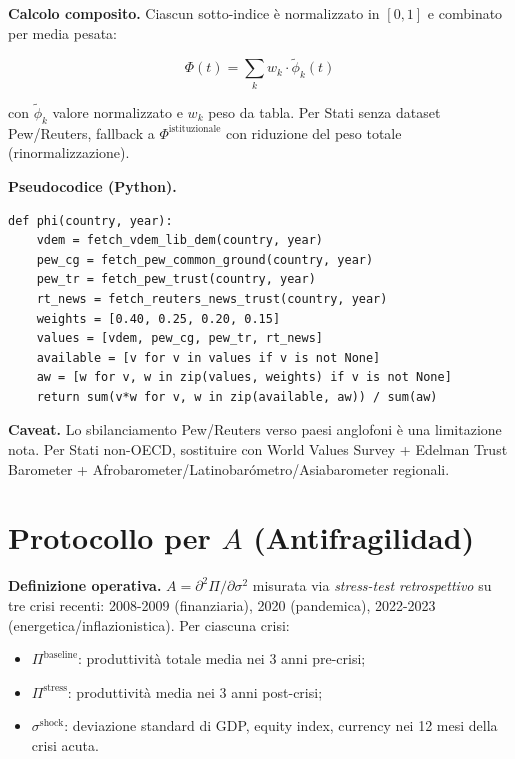 \Proved{} \textbf{Calcolo composito.} Ciascun sotto-indice è
normalizzato in \([0, 1]\) e combinato per media pesata:

\[
\Phi(t) = \sum_k w_k \cdot \tilde{\phi}_k(t)
\]

con \(\tilde{\phi}_k\) valore normalizzato e \(w_k\) peso da tabla.
Per Stati senza dataset Pew/Reuters, fallback a
\(\Phi^{\text{istituzionale}}\) con riduzione del peso totale
(rinormalizzazione).

\Hypoth{} \textbf{Pseudocodice (Python).}

\begin{verbatim}
def phi(country, year):
    vdem = fetch_vdem_lib_dem(country, year)
    pew_cg = fetch_pew_common_ground(country, year)
    pew_tr = fetch_pew_trust(country, year)
    rt_news = fetch_reuters_news_trust(country, year)
    weights = [0.40, 0.25, 0.20, 0.15]
    values = [vdem, pew_cg, pew_tr, rt_news]
    available = [v for v in values if v is not None]
    aw = [w for v, w in zip(values, weights) if v is not None]
    return sum(v*w for v, w in zip(available, aw)) / sum(aw)
\end{verbatim}

\Conj{} \textbf{Caveat.} Lo sbilanciamento Pew/Reuters verso paesi
anglofoni è una limitazione nota. Per Stati non-OECD, sostituire con
World Values Survey + Edelman Trust Barometer +
Afrobarometer/Latinobarómetro/Asiabarometer regionali.



\section{\texorpdfstring{Protocollo per \(A\)
(Antifragilidad)}{Protocollo per A (Antifragilidad)}}\label{protocollo-per-a-antifragilituxe0}

\Hypoth{} \textbf{Definizione operativa.}
\(A = \partial^2\Pi/\partial\sigma^2\) misurata via \emph{stress-test
retrospettivo} su tre crisi recenti: 2008-2009 (finanziaria), 2020
(pandemica), 2022-2023 (energetica/inflazionistica). Per ciascuna crisi:

\begin{itemize}
\tightlist
\item
  \(\Pi^{\text{baseline}}\): produttività totale media nei 3 anni
  pre-crisi;
\item
  \(\Pi^{\text{stress}}\): produttività media nei 3 anni post-crisi;
\item
  \(\sigma^{\text{shock}}\): deviazione standard di GDP, equity index,
  currency nei 12 mesi della crisi acuta.
\end{itemize}

